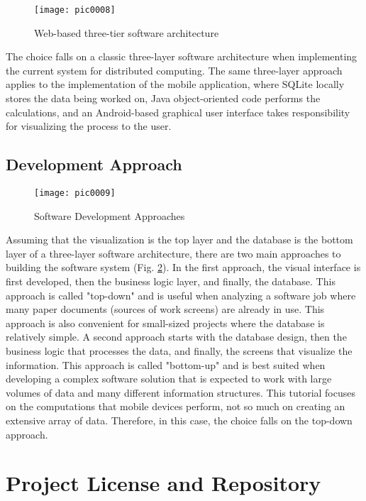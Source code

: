 \begin{figure}[h]
\centering
\texttt{[image: pic0008]}
\caption{Web-based three-tier software architecture}
\label{fig:pic0008}
\end{figure}

The choice falls on a classic three-layer software architecture when implementing the current system for distributed computing. The same three-layer approach applies to the implementation of the mobile application, where SQLite locally stores the data being worked on, Java object-oriented code performs the calculations, and an Android-based graphical user interface takes responsibility for visualizing the process to the user.

\subsection{Development Approach}

\begin{figure}[h]
\centering
\texttt{[image: pic0009]}
\caption{Software Development Approaches}
\label{fig:pic0009}
\end{figure}

Assuming that the visualization is the top layer and the database is the bottom layer of a three-layer software architecture, there are two main approaches to building the software system (Fig. \ref{fig:pic0009}). In the first approach, the visual interface is first developed, then the business logic layer, and finally, the database. This approach is called "top-down" and is useful when analyzing a software job where many paper documents (sources of work screens) are already in use. This approach is also convenient for small-sized projects where the database is relatively simple. A second approach starts with the database design, then the business logic that processes the data, and finally, the screens that visualize the information. This approach is called "bottom-up" and is best suited when developing a complex software solution that is expected to work with large volumes of data and many different information structures. This tutorial focuses on the computations that mobile devices perform, not so much on creating an extensive array of data. Therefore, in this case, the choice falls on the top-down approach.

\section{Project License and Repository}

